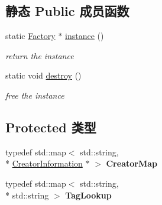 \subsection*{静态 Public 成员函数}
\begin{DoxyCompactItemize}
\item 
\hypertarget{classg2o_1_1Factory_a8a1f33e017c5ad59399cef48972578ae}{static \hyperlink{classg2o_1_1Factory}{Factory} $\ast$ \hyperlink{classg2o_1_1Factory_a8a1f33e017c5ad59399cef48972578ae}{instance} ()}\label{classg2o_1_1Factory_a8a1f33e017c5ad59399cef48972578ae}

\begin{DoxyCompactList}\small\item\em return the instance \end{DoxyCompactList}\item 
\hypertarget{classg2o_1_1Factory_ab40f0aa18dabb91a35de7186ede9355a}{static void \hyperlink{classg2o_1_1Factory_ab40f0aa18dabb91a35de7186ede9355a}{destroy} ()}\label{classg2o_1_1Factory_ab40f0aa18dabb91a35de7186ede9355a}

\begin{DoxyCompactList}\small\item\em free the instance \end{DoxyCompactList}\end{DoxyCompactItemize}
\subsection*{Protected 类型}
\begin{DoxyCompactItemize}
\item 
\hypertarget{classg2o_1_1Factory_a639c8d850892dddc20098e9aa97ef9e8}{typedef std\-::map$<$ std\-::string, \\*
\hyperlink{classg2o_1_1Factory_1_1CreatorInformation}{Creator\-Information} $\ast$ $>$ {\bfseries Creator\-Map}}\label{classg2o_1_1Factory_a639c8d850892dddc20098e9aa97ef9e8}

\item 
\hypertarget{classg2o_1_1Factory_aba274179c053b3b71dcef6a20c898496}{typedef std\-::map$<$ std\-::string, \\*
std\-::string $>$ {\bfseries Tag\-Lookup}}\label{classg2o_1_1Factory_aba274179c053b3b71dcef6a20c898496}

\end{DoxyCompactItemize}
